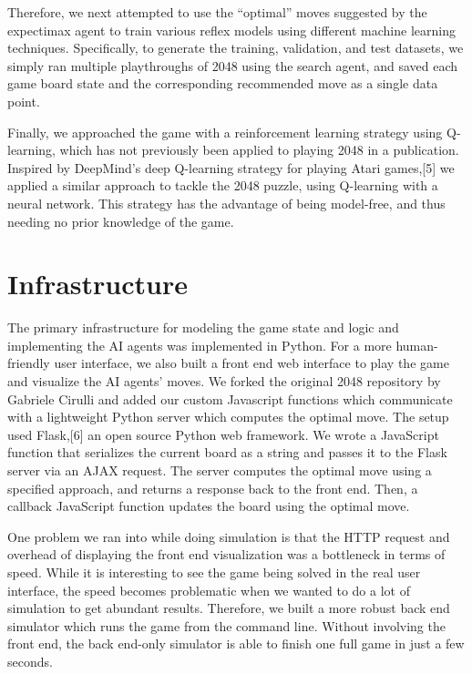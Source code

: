 \documentclass[9pt,twocolumn]{article}
\begin{document}
Therefore, we next attempted to use the “optimal” moves suggested by the expectimax agent to train various reflex models using different machine learning techniques. Specifically, to generate the training, validation, and test datasets, we simply ran multiple playthroughs of 2048 using the search agent, and saved each game board state and the corresponding recommended move as a single data point.

Finally, we approached the game with a reinforcement learning strategy using Q-learning, which has not previously been applied to playing 2048 in a publication. Inspired by DeepMind's deep Q-learning strategy for playing Atari games,[5] we applied a similar approach to tackle the 2048 puzzle, using Q-learning with a neural network. This strategy has the advantage of being model-free, and thus needing no prior knowledge of the game.

\section{Infrastructure}

The primary infrastructure for modeling the game state and logic and implementing the AI agents was implemented in Python. For a more human-friendly user interface, we also built a front end web interface to play the game and visualize the AI agents' moves. We forked the original 2048 repository by Gabriele Cirulli and added our custom Javascript functions which communicate with a lightweight Python server which computes the optimal move. The setup used Flask,[6] an open source Python web framework. We wrote a JavaScript function that serializes the current board as a string and passes it to the Flask server via an AJAX request. The server computes the optimal move using a specified approach, and returns a response back to the front end. Then, a callback JavaScript function updates the board using the optimal move.

One problem we ran into while doing simulation is that the HTTP request and overhead of displaying the front end visualization was a bottleneck in terms of speed. While it is interesting to see the game being solved in the real user interface, the speed becomes problematic when we wanted to do a lot of simulation to get abundant results. Therefore, we built a more robust back end simulator which runs the game from the command line. Without involving the front end, the back end-only simulator is able to finish one full game in just a few seconds.
\end{document}
